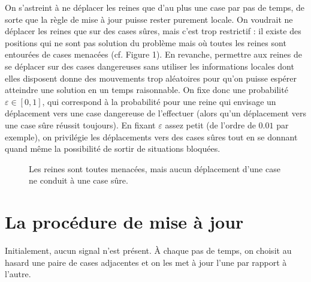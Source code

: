 \documentclass[11pt, openany]{article}
\begin{document}
On s'astreint à ne déplacer les reines que d'au plus une case par pas de temps, de sorte que la règle de mise à jour puisse rester purement locale. On voudrait ne déplacer les reines que sur des cases sûres, mais c'est trop restrictif : il existe des positions qui ne sont pas solution du problème mais où toutes les reines sont entourées de cases menacées (cf. Figure 1). En revanche, permettre aux reines de se déplacer sur des cases dangereuses sans utiliser les informations locales dont elles disposent donne des mouvements trop aléatoires pour qu'on puisse espérer atteindre une solution en un temps raisonnable. On fixe donc une probabilité $\varepsilon \in [0,1]$, qui correspond à la probabilité pour une reine qui envisage un déplacement vers une case dangereuse de l'effectuer (alors qu'un déplacement vers une case sûre réussit toujours). En fixant $\varepsilon$ assez petit (de l'ordre de $0.01$ par exemple), on privilégie les déplacements vers des cases sûres tout en se donnant quand même la possibilité de sortir de situations bloquées.


\begin{figure}
\centering

\newgame
{}
\notationoff
\showboard
\caption{Les reines sont toutes menacées, mais aucun déplacement d'une case ne conduit à une case sûre.}
\end{figure}

\section*{La procédure de mise à jour}

Initialement, aucun signal n'est présent.
À chaque pas de temps, on choisit au hasard une paire de cases adjacentes et on les met à jour l'une par rapport à l'autre. 
\bigskip
\end{document}
